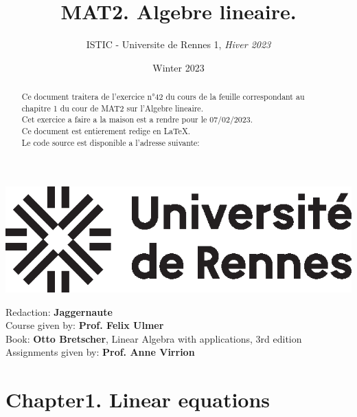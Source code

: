 \documentclass{config/homework}
\title{\fontfamily{phv}\selectfont MAT2. Algebre lineaire.}
\author{ISTIC - Universite de Rennes 1, \textit{Hiver 2023}}
\date{Winter 2023}
\begin{document}
    \begin{titlepage}

        \maketitle

        \begin{abstract}
            Ce document traitera de l'exercice n°42 du cours de la feuille correspondant
            au chapitre 1 du cour de MAT2 sur l'Algebre lineaire. \\
            Cet exercice a faire a la maison est a rendre pour le 07/02/2023.\\
            Ce document est entierement redige en LaTeX. \\
            Le code source est disponible a l'adresse suivante: \url{}
        \end{abstract}
        \vspace{5em}
        \center\includegraphics{images/univ-logo}

        \newpage

        \tableofcontents

        \vspace{5em}

        \begin{contributors}
            \vspace{.25em}
            Redaction: \textbf{Jaggernaute} \\
            Course given by: \textbf{Prof. Felix Ulmer} \\
            Book: \textbf{Otto Bretscher}, Linear Algebra with applications,
            3rd edition \\
            Assignments given by: \textbf{Prof. Anne Virrion} \\
            \vspace{.25em}
        \end{contributors}

    \end{titlepage}

    \section{Chapter1. Linear equations}\label{sec:section}
\end{document}
